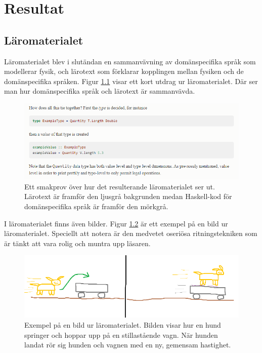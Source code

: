 
\chapter{Resultat}

\begin{binge}

\section{Läromaterialet}

Läromaterialet blev i slutändan en sammanvävning av domänspecifika språk som modellerar fysik, och lärotext som förklarar kopplingen mellan fysiken och de domänspecifika språken. Figur \ref{fig:smakprov_laromaterial} visar ett kort utdrag ur läromaterialet. Där ser man hur domänspecifika språk och lärotext är sammanvävda.

\begin{figure}[tph]
  \includegraphics[width=\linewidth]{figure/smakprov_laromaterial.png}
  \caption{Ett smakprov över hur det resulterande läromaterialet ser ut. Lärotext är framför den ljusgrå bakgrunden medan Haskell-kod för domänspecifika språk är framför den mörkgrå.}
  \label{fig:smakprov_laromaterial}
\end{figure}

I läromaterialet finns även bilder. Figur \ref{fig:smakprov_bild_laromaterial} är ett exempel på en bild ur läromaterialet. Speciellt att notera är den medvetet oseriösa ritningstekniken som är tänkt att vara rolig och muntra upp läsaren.

\begin{figure}
  \includegraphics[width=\linewidth]{figure/smakprov_bild_laromaterial.png}
  \caption{Exempel på en bild ur läromaterialet. Bilden visar hur en hund springer och hoppar upp på en stillastående vagn. När hunden landat rör sig hunden och vagnen med en ny, gemensam hastighet.}
  \label{fig:smakprov_bild_laromaterial}
\end{figure}


\end{binge}
